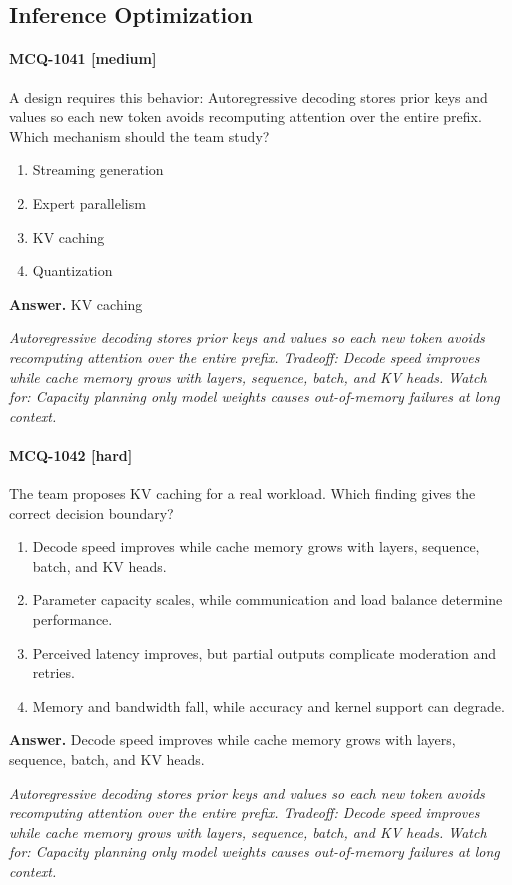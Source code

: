 \subsection{Inference Optimization}
\paragraph{MCQ-1041 [medium]} A design requires this behavior: Autoregressive decoding stores prior keys and values so each new token avoids recomputing attention over the entire prefix. Which mechanism should the team study?
\begin{enumerate}[label=\Alph*.]
\item Streaming generation
\item Expert parallelism
\item KV caching
\item Quantization
\end{enumerate}
\noindent\textbf{Answer.} KV caching
\par\textit{Autoregressive decoding stores prior keys and values so each new token avoids recomputing attention over the entire prefix. Tradeoff: Decode speed improves while cache memory grows with layers, sequence, batch, and KV heads. Watch for: Capacity planning only model weights causes out-of-memory failures at long context.}
\paragraph{MCQ-1042 [hard]} The team proposes KV caching for a real workload. Which finding gives the correct decision boundary?
\begin{enumerate}[label=\Alph*.]
\item Decode speed improves while cache memory grows with layers, sequence, batch, and KV heads.
\item Parameter capacity scales, while communication and load balance determine performance.
\item Perceived latency improves, but partial outputs complicate moderation and retries.
\item Memory and bandwidth fall, while accuracy and kernel support can degrade.
\end{enumerate}
\noindent\textbf{Answer.} Decode speed improves while cache memory grows with layers, sequence, batch, and KV heads.
\par\textit{Autoregressive decoding stores prior keys and values so each new token avoids recomputing attention over the entire prefix. Tradeoff: Decode speed improves while cache memory grows with layers, sequence, batch, and KV heads. Watch for: Capacity planning only model weights causes out-of-memory failures at long context.}
